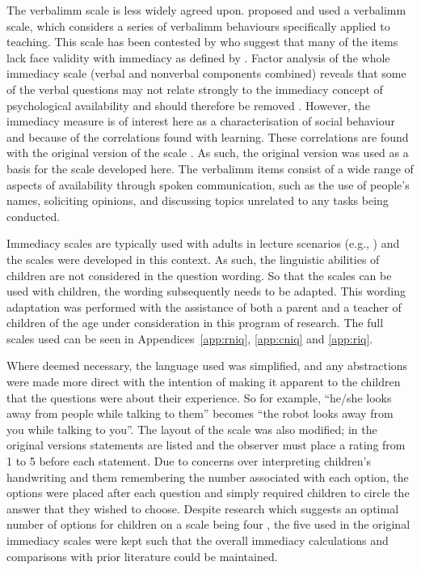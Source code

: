 The \gls{verbalimm} scale is less widely agreed upon. \cite{gorham1988relationship} proposed and used a \gls{verbalimm} scale, which considers a series of \gls{verbalimm} behaviours specifically applied to teaching. This scale has been contested by \cite{robinson1995validity} who suggest that many of the items lack face validity with \gls{immediacy} as defined by \cite{mehrabian1968some}. Factor analysis of the whole \gls{immediacy} scale (verbal and nonverbal components combined) reveals that some of the verbal questions may not relate strongly to the \gls{immediacy} concept of psychological availability and should therefore be removed \citep{wilson2007immediacy}. However, the \gls{immediacy} measure is of interest here as a characterisation of social behaviour and because of the correlations found with learning. These correlations are found with the original version of the scale \citep{gorham1988relationship}. As such, the original version was used as a basis for the scale developed here. The \gls{verbalimm} items consist of a wide range of aspects of availability through spoken communication, such as the use of people's names, soliciting opinions, and discussing topics unrelated to any tasks being conducted. 

Immediacy scales are typically used with adults in lecture scenarios (e.g., \citealp{mccroskey1996nonverbal}) and the scales were developed in this context. As such, the linguistic abilities of children are not considered in the question wording. So that the scales can be used with children, the wording subsequently needs to be adapted. This wording adaptation was performed with the assistance of both a parent and a teacher of children of the age under consideration in this program of research. The full scales used can be seen in Appendices~\ref{app:rniq}, \ref{app:cniq} and \ref{app:riq}.

Where deemed necessary, the language used was simplified, and any abstractions were made more direct with the intention of making it apparent to the children that the questions were about their experience. So for example, ``he/she looks away from people while talking to them'' becomes ``the robot looks away from you while talking to you''. The layout of the scale was also modified; in the original versions statements are listed and the observer must place a rating from 1 to 5 before each statement. Due to concerns over interpreting children's handwriting and them remembering the number associated with each option, the options were placed after each question and simply required children to circle the answer that they wished to choose. Despite research which suggests an optimal number of options for children on a scale being four \citep{borgers2004response}, the five used in the original \gls{immediacy} scales were kept such that the overall \gls{immediacy} calculations and comparisons with prior literature could be maintained.

